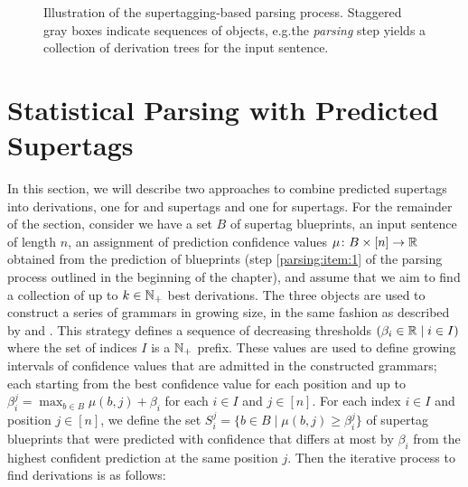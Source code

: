 \documentclass[../document.tex]{subfiles}
\begin{document}
    \begin{figure}
        
        \caption{
            Illustration of the supertagging-based parsing process.
            Staggered gray boxes indicate sequences of objects, e.g.\@ the \emph{parsing} step yields a collection of derivation trees for the input sentence.
        }
    \end{figure}

    \section{Statistical Parsing with Predicted Supertags}\label{sec:parsing}
    In this section, we will describe two approaches to combine predicted supertags into derivations, one for  and  supertags and one for  supertags.
    For the remainder of the section, consider we have a set \(B\) of supertag blueprints, an input sentence of length \(n\), an assignment of prediction confidence values \(\mu\colon B \times [n] \to \mathbb{R}\) obtained from the prediction of blueprints (step \ref{parsing:item:1} of the parsing process outlined in the beginning of the chapter), and assume that we aim to find a collection of up to \(k \in \mathbb{N}_+\) best derivations.
    The three objects are used to construct a series of grammars in growing size, in the same fashion as described by \citet[Section 5.1]{Clark04} and \citet[Section 2.2.2]{Auli12}.
    This strategy defines a sequence of decreasing thresholds \((\beta_i \in \mathbb{R} \mid i \in I)\) where the set of indices \(I\) is a \(\mathbb{N}_+\) prefix.
    These values are used to define growing intervals of confidence values that are admitted in the constructed grammars; each starting from the best confidence value for each position and up to \(\beta_i^j = \max_{b \in B} \mu(b, j) + \beta_i\) for each \(i \in I\) and \(j \in [n]\).
    For each index \(i \in I\) and position \(j \in [n]\), we define the set \(S_i^j = \{ b \in B \mid \mu(b, j) \ge \beta^j_i \}\) of supertag blueprints that were predicted with confidence that differs at most by \(\beta_i\) from the highest confident prediction at the same position \(j\).
    Then the iterative process to find derivations is as follows:
\end{document}
